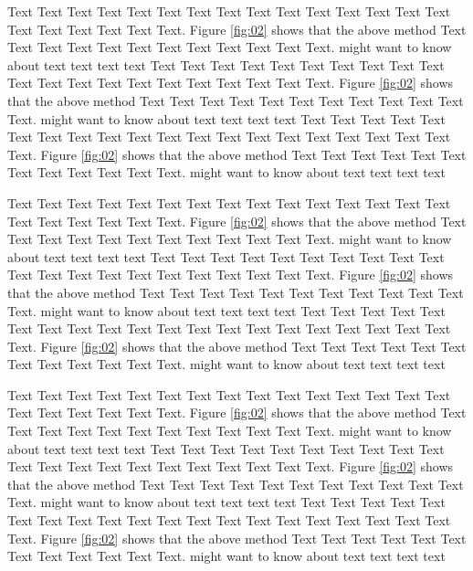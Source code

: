 \documentclass{bioinfo}
\begin{document}
\begin{methods}
Text Text Text Text Text Text  Text Text Text Text Text Text Text Text Text  Text Text Text Text Text Text. Figure \ref{fig:02} shows that the above method  Text Text Text Text  Text Text Text Text Text Text  Text Text.  \citealp{Boffelli03} might want to know about  text text text text
Text Text Text Text Text Text  Text Text Text Text Text Text Text Text Text  Text Text Text Text Text Text. Figure \ref{fig:02} shows that the above method  Text Text Text Text  Text Text Text Text Text Text  Text Text.  \citealp{Boffelli03} might want to know about  text text text text
Text Text Text Text Text Text  Text Text Text Text Text Text Text Text Text  Text Text Text Text Text Text. Figure \ref{fig:02} shows that the above method  Text Text Text Text  Text Text Text Text Text Text  Text Text.  \citealp{Boffelli03} might want to know about  text text text text



Text Text Text Text Text Text  Text Text Text Text Text Text Text Text Text  Text Text Text Text Text Text. Figure \ref{fig:02} shows that the above method  Text Text Text Text  Text Text Text Text Text Text  Text Text.  \citealp{Boffelli03} might want to know about  text text text text
Text Text Text Text Text Text  Text Text Text Text Text Text Text Text Text  Text Text Text Text Text Text. Figure \ref{fig:02} shows that the above method  Text Text Text Text  Text Text Text Text Text Text  Text Text.  \citealp{Boffelli03} might want to know about  text text text text
Text Text Text Text Text Text  Text Text Text Text Text Text Text Text Text  Text Text Text Text Text Text. Figure \ref{fig:02} shows that the above method  Text Text Text Text  Text Text Text Text Text Text  Text Text.  \citealp{Boffelli03} might want to know about  text text text text


Text Text Text Text Text Text  Text Text Text Text Text Text Text Text Text  Text Text Text Text Text Text. Figure \ref{fig:02} shows that the above method  Text Text Text Text  Text Text Text Text Text Text  Text Text.  \citealp{Boffelli03} might want to know about  text text text text
Text Text Text Text Text Text  Text Text Text Text Text Text Text Text Text  Text Text Text Text Text Text. Figure \ref{fig:02} shows that the above method  Text Text Text Text  Text Text Text Text Text Text  Text Text.  \citealp{Boffelli03} might want to know about  text text text text
Text Text Text Text Text Text  Text Text Text Text Text Text Text Text Text  Text Text Text Text Text Text. Figure \ref{fig:02} shows that the above method  Text Text Text Text  Text Text Text Text Text Text  Text Text.  \citealp{Boffelli03} might want to know about  text text text text




\end{methods}
\end{document}
